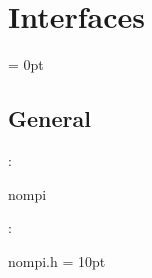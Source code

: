 
\section{Interfaces} 


\parskip = 0pt

\vspace{3mm} \subsection*{General}

: 

nompi
\vspace{2mm}

\vspace{5mm}

: 



nompi.h
\vspace{2mm}\parskip = 10pt 
